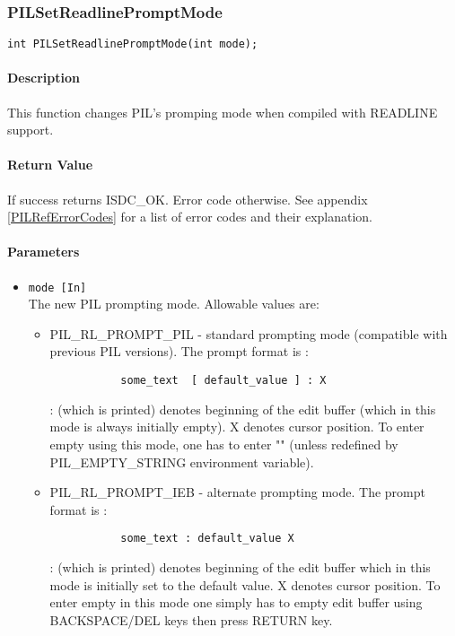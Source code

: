 
\subsubsection{PILSetReadlinePromptMode}\label{PILSetReadlinePromptMode}

\begin{verbatim}
int PILSetReadlinePromptMode(int mode); 
\end{verbatim}

\paragraph{Description\\}
This function changes PIL's promping mode when compiled
with READLINE support. 

\paragraph{Return Value\\}
If success returns ISDC\_OK. Error code otherwise. See appendix \ref{PILRefErrorCodes}
for a list of error codes and their explanation.

\paragraph{Parameters}
\begin{itemize}
\item
{\tt mode [In] } \\
The new PIL prompting mode. Allowable values are:

\begin{itemize}
\item PIL\_RL\_PROMPT\_PIL - standard prompting mode (compatible
with previous PIL versions). The prompt format is :

\begin{verbatim}
           some_text  [ default_value ] : X
\end{verbatim}

: (which is printed) denotes beginning of the edit buffer (which in 
this mode is always initially empty).
X denotes cursor position. To enter empty using this mode, one has to
enter "" (unless redefined by PIL\_EMPTY\_STRING environment variable).

\item PIL\_RL\_PROMPT\_IEB - alternate prompting mode. The prompt
format is :

\begin{verbatim}
           some_text : default_value X
\end{verbatim}

: (which is printed) denotes beginning of the edit buffer which in 
this mode is initially set to the default value.
X denotes cursor position. To enter empty in this mode one
simply has to empty edit buffer using BACKSPACE/DEL keys then 
press RETURN key.
\end{itemize}
\end{itemize}


